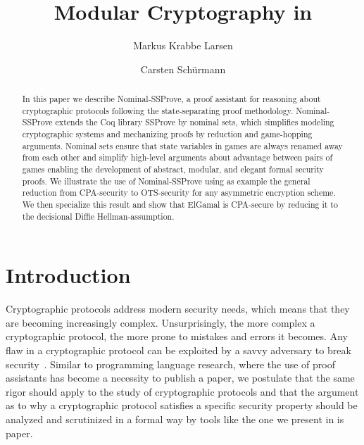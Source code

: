 \documentclass[a4paper,USenglish,cleveref, autoref]{lipics-v2021}
\title{Modular Cryptography in \NSSP}
\author{Markus Krabbe Larsen}{Theoretical Computer Science, IT University of Copenhagen}{krml@itu.dk}{orcid}{funding}
\author{Carsten Sch\"urmann}{Theoretical Computer Science, IT University of Copenhagen}{carsten@itu.dk}{orcid}{funding}
\begin{document}
\maketitle

\begin{abstract}
  In this paper we describe Nominal-SSProve, a proof assistant for reasoning about cryptographic protocols following the state-separating proof methodology. Nominal-SSProve extends the Coq library SSProve by nominal sets, which simplifies modeling cryptographic systems and mechanizing proofs by reduction and game-hopping arguments. Nominal sets ensure that state variables in games are always renamed away from each other and simplify high-level arguments about advantage between pairs of games enabling the development of abstract, modular, and elegant formal security proofs. We illustrate the use of Nominal-SSProve using as example the general reduction from CPA-security to OTS-security for any asymmetric encryption scheme. We then specialize this result and show that ElGamal is CPA-secure by reducing it to the decisional Diffie Hellman-assumption.
\end{abstract}

 

\section{Introduction}\label{sec:intro}

Cryptographic protocols address modern security needs, which means
that they are becoming increasingly complex. Unsurprisingly, the more
complex a cryptographic protocol, the more prone to mistakes and
errors it becomes. Any flaw in a cryptographic protocol can be
exploited by a savvy adversary to break
security~\cite{bellare-rogaway}.  Similar to programming language
research, where the use of proof assistants has become a necessity to
publish a paper, we postulate that the same rigor should  apply to the study of
cryptographic protocols  and that the argument as to why a cryptographic protocol
satisfies a specific security property should be analyzed and scrutinized in a formal way by tools like the one we present in is paper.
\end{document}

